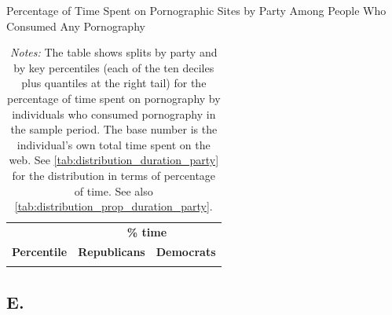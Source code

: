 \documentclass[12pt,twoside]{article}
\begin{document}
\begin{table}[ht] \centering \small \setlength\tabcolsep{10 pt}
	\caption{Percentage of Time Spent on Pornographic Sites by Party Among People Who Consumed Any Pornography}
	\label{tab:distribution_prop_duration_party_mar}
	\begin{adjustbox}{max width=\textwidth}
		\begin{tabular}{crr}
			\toprule
			\multicolumn{1}{l}{\textbf{}}&\multicolumn{2}{c}{\textbf{\% time}}\\
			\cmidrule(l){2-3}
			\multicolumn{1}{l}{\textbf{Percentile}}&\multicolumn{1}{c}{\textbf{Republicans}}&\multicolumn{1}{c}{\textbf{Democrats}}\\
			\midrule
			\\
			\bottomrule
		\end{tabular}
	\end{adjustbox}
	\caption*{\footnotesize \emph{Notes:} 
		The table shows splits by party and by key percentiles (each of the ten deciles plus quantiles at the right tail) for the percentage of time spent on pornography by individuals who consumed pornography in the sample period. 
        The base number is the individual's own total time spent on the web.
		See \cref{tab:distribution_duration_party} for the distribution in terms of percentage of time.
          See also \cref{tab:distribution_prop_duration_party}.
	}
\end{table}

\setcounter{table}{0}
\setcounter{figure}{0}
\setcounter{equation}{0}

\FloatBarrier
\renewcommand{\thetable}{E\arabic{table}}
\renewcommand{\thefigure}{E\arabic{figure}}
\renewcommand{\theequation}{E\arabic{equation}}
\subsection{E. \smETitle{}}\label{sm:smE}
\end{document}
